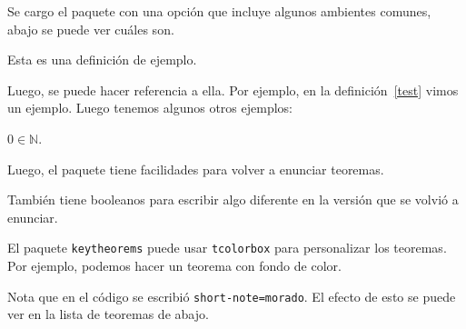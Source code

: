 Se cargo el paquete con una opción que incluye algunos ambientes comunes, abajo
se puede ver cuáles son.

\begin{definition}[label=test]
  Esta es una definición de ejemplo.  
\end{definition}

Luego, se puede hacer referencia a ella. Por ejemplo, en la
definición~\ref{test} vimos un ejemplo. Luego tenemos algunos otros ejemplos:

\begin{lemma}
  \lipsum[1][1]
\end{lemma}

\begin{theorem}[store=teo]
  \lipsum[1][2]
\end{theorem}

\begin{corollary}
  \lipsum[1][3]
\end{corollary}

\begin{proposition}
  \lipsum[1][4]
\end{proposition}

\begin{remark}[store=obs]
   \lipsum[1][5]
\end{remark}

\begin{axiom}[note=Peano]
  \(0\in\mathbb{N}\).
\end{axiom}

\begin{conjecture}
  \lipsum[1][6]
\end{conjecture}

\begin{example}
  \lipsum[1][7]
\end{example}

Luego, el paquete tiene facilidades para volver a enunciar teoremas.


También tiene booleanos para escribir algo diferente en la versión que se volvió
a enunciar.


El paquete \texttt{keytheorems} puede usar \texttt{tcolorbox} para
personalizar los teoremas. Por ejemplo, podemos hacer un teorema con fondo de color.

\begin{teo}[note=Teorema con fondo, short-note=morado]
  Nota que en el código se escribió \verb|short-note=morado|. El efecto de esto
  se puede ver en la lista de teoremas de abajo.
\end{teo}

